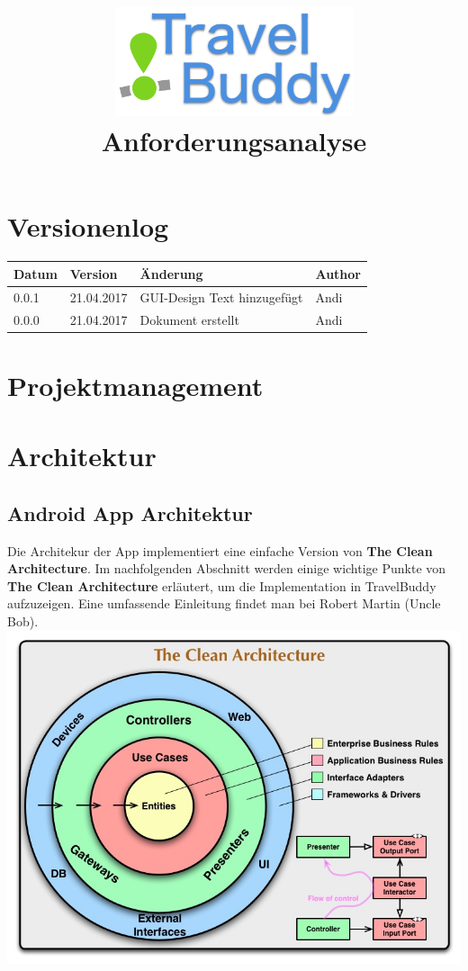 \documentclass[a4paper,10pt,xetex]{article}
\title{
  \includegraphics[width=7cm]{travel-buddy_white}\\[\bigskipamount]
  Anforderungsanalyse\\[\bigskipamount]
}
\author{\documentauthors}
\date{\parbox{\linewidth}{\centering%
  IT15TA ZH \hspace*{3cm} Gruppe 3\endgraf\bigskip
  \documentdate\endgraf
}}
\begin{document}
\maketitle\newpage

{
\hypersetup{linkcolor=black}
\setcounter{tocdepth}{3}
\tableofcontents
}

\newpage

\section{Versionenlog}\label{versionenlog}

\tabulinesep=1.2mm

\begin{longtabu} to \textwidth { | l | l | X[l] | l | }
  \hline
  \textbf{Datum} & \textbf{Version} & \textbf{Änderung} & \textbf{Author} \\
  \hline
  \endhead

  0.0.1 & 21.04.2017 & GUI-Design Text hinzugefügt & Andi\\
  \hline

  0.0.0 & 21.04.2017 & Dokument erstellt & Andi\\
  \hline
\end{longtabu}
\newpage

\section{Projektmanagement}\label{projektmanagement}
\section{Architektur}\label{architektur}
\subsection{Android App Architektur}\label{androidapparchitektur}

Die Architekur der App implementiert eine einfache Version von \textbf{The Clean Architecture}. 
Im nachfolgenden Abschnitt werden einige wichtige Punkte von \textbf{The Clean Architecture} 
erläutert, um die Implementation in TravelBuddy aufzuzeigen. Eine umfassende 
Einleitung findet man bei Robert Martin (Uncle Bob).
{\includegraphics{cleanarchitecture}}
\end{document}
